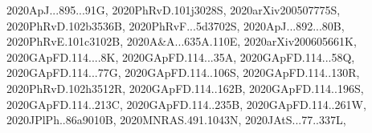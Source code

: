 \documentclass[12pt]{article}
\begin{document}
\begin{description}
{2020ApJ...895...91G,%
2020PhRvD.101j3028S,%
2020arXiv200507775S,%
2020PhRvD.102b3536B,%
2020PhRvF...5d3702S,%
2020ApJ...892...80B,%
2020PhRvE.101c3102B,%
2020A&A...635A.110E,%
2020arXiv200605661K,%
2020GApFD.114....8K,%
2020GApFD.114...35A,%
2020GApFD.114...58Q,%
2020GApFD.114...77G,%
2020GApFD.114..106S,%
2020GApFD.114..130R,%
2020PhRvD.102h3512R,%
2020GApFD.114..162B,%
2020GApFD.114..196S,%
2020GApFD.114..213C,%
2020GApFD.114..235B,%
2020GApFD.114..261W,%
2020JPlPh..86a9010B,%
2020MNRAS.491.1043N,%
2020JAtS...77..337L,%
}
\end{description}
\end{document}
